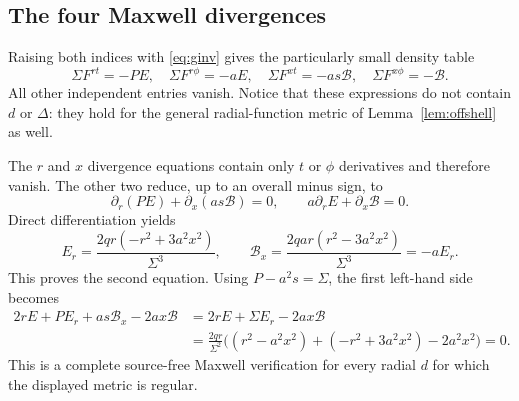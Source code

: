 \documentclass[11pt,a4paper]{article}
\numberwithin{equation}{section}
\theoremstyle{definition}\newtheorem{definition}[theorem]{Definition}
\theoremstyle{remark}\newtheorem{remark}[theorem]{Remark}
\newcommand{\calB}{\mathcal{B}}
\begin{document}
\subsection{The four Maxwell divergences}
Raising both indices with \eqref{eq:ginv} gives the particularly small density table
\begin{equation}\label{eq:density}
 \Sigma F^{rt}=-PE,\quad \Sigma F^{r\phi}=-aE,\quad
 \Sigma F^{xt}=-as\calB,\quad \Sigma F^{x\phi}=-\calB.
\end{equation}
All other independent entries vanish. Notice that these expressions do not contain $d$ or $\Delta$: they hold for the general radial-function metric of Lemma~\ref{lem:offshell} as well.

The $r$ and $x$ divergence equations contain only $t$ or $\phi$ derivatives and therefore vanish. The other two reduce, up to an overall minus sign, to
\begin{equation}\label{eq:twoMaxwell}
 \partial_r(PE)+\partial_x(as\calB)=0,
 \qquad a\partial_r E+\partial_x\calB=0.
\end{equation}
Direct differentiation yields
\begin{equation}\label{eq:EBderiv}
 E_r=\frac{2qr(-r^2+3a^2x^2)}{\Sigma^3},\qquad
 \calB_x=\frac{2qar(r^2-3a^2x^2)}{\Sigma^3}=-aE_r.
\end{equation}
This proves the second equation. Using $P-a^2s=\Sigma$, the first left-hand side becomes
\begin{align*}
 2rE+PE_r+as\calB_x-2ax\calB
 &=2rE+\Sigma E_r-2ax\calB\\
 &=\frac{2qr}{\Sigma^2}
       \bigl((r^2-a^2x^2)+(-r^2+3a^2x^2)-2a^2x^2\bigr)=0.
\end{align*}
This is a complete source-free Maxwell verification for every radial $d$ for which the displayed metric is regular.
\end{document}
